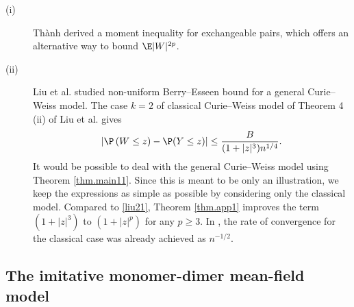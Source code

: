 	
	\begin{remark}
\begin{description}
\item[(i)] Th\`{a}nh \cite{thanh2025moment} 
derived a moment inequality for exchangeable pairs, which offers an alternative way to bound $\E|W|^{2p}$.
\item[(ii)] Liu et al. \cite{liu2021non} studied non-uniform Berry--Esseen bound for a general Curie--Weiss model.
		The case $k=2$ of classical Curie--Weiss model of Theorem 4 (ii) of Liu et al. \cite{liu2021non} gives
		\begin{equation}\label{liu21}
			\left|\P\left(W\le z\right) -\P(Y\le z)\right| \le \dfrac{B}{(1+|z|^3) n^{1/4}}.
		\end{equation}
		It would be possible to deal with the general Curie--Weiss model
		using Theorem \ref{thm.main11}. 
		Since this is meant to be only an illustration, we keep the expressions as simple as possible by considering only the classical model.
		Compared to \eqref{liu21}, Theorem \ref{thm.app1} improves the term $(1+|z|^3)$ to
		$(1+|z|^p)$ for any $p\ge3$. In \cite{can2017cramer,chatterjee2011nonnormal,eichelsbacher2010stein}, 
		the rate of convergence for the classical case was already achieved as $n^{-1/2}$.
\end{description}
\end{remark}
	
	\subsection{The imitative monomer-dimer mean-field model}
	
